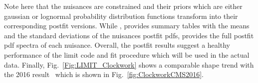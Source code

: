 \begin{spacing}{2}
Note here that the nuisances are constrained and their priors which are either gaussian or lognormal probability distribution functions transform into their corresponding postfit versions. While \COMBINE, provides summary tables with the means and the standard deviations of the nuisances postfit pdfs, \THETA provides the full postfit pdf spectra of each nuisance. Overall, the postfit results suggest a healthy performance of the limit code and fit procedure which will be used in the actual data. Finally, Fig.~\ref{Fig:LIMIT_Clockwork} shows a comparable shape trend with the 2016 result~\cite{cmsdiphoton2016} which is shown in Fig.~\ref{fig:ClockworkCMS2016}.




\begin{figure}[!htbp]{}
\end{figure}
\end{spacing}
